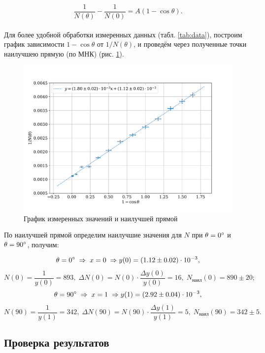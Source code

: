 \documentclass[a4paper,12pt]{article} %
\begin{document}
\begin{equation}
\frac{1}{N(\theta)} - \frac{1}{N(0)} = A(1 - \cos{\theta}).
\label{e:e3}
\end{equation}

\paragraph{} Для более удобной обработки измеренных данных (табл. \ref{tab:data}), построим график зависимости $1 - \cos{\theta}$ от $1/N(\theta)$, и проведём через полученные точки наилучшею прямую (по МНК) (рис. \ref{fig:plot}). 

\begin{figure}
\centering
\includegraphics[width=\textwidth]{plot_2.pdf}
\caption{График измеренных значений и наилучшей прямой}
\label{fig:plot}
\end{figure}

По наилучшей прямой определим наилучшие значения для $N$ при $\theta = 0\degree$ и $\theta = 90\degree$, получим:

\[
\theta = 0\degree \; \Rightarrow \; x = 0 \; \Rightarrow y(0) = (1.12 \pm 0.02) \cdot 10^{-3},
\]\[
N(0) = \frac{1}{y(0)} = 893, \; \Delta N(0) = N(0) \cdot \frac{\Delta y(0)}{y(0)} = 16, \; N_\text{наил}(0) = 890 \pm 20;
\]\[
\theta = 90\degree \; \Rightarrow \; x = 1 \; \Rightarrow y(1) = (2.92 \pm 0.04) \cdot 10^{-3},
\]\[
N(90) = \frac{1}{y(1)} = 342, \; \Delta N(90) = N(90) \cdot \frac{\Delta y(1)}{y(1)} = 5, \;
N_\text{наил}(90) = 342 \pm 5.
\]

\subsection{Проверка результатов}
\end{document}
